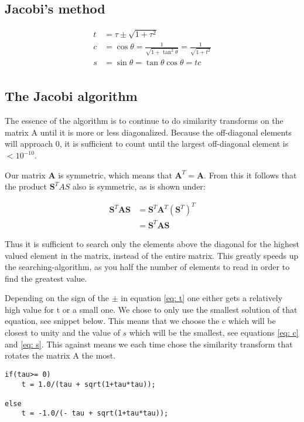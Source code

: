 \subsection{Jacobi's method}

\begin{align*}
t &= \tau \pm \sqrt{1+\tau^2}\\ 
c &= \cos \theta = \frac{1}{\sqrt{1+\tan^2\theta}} = \frac{1}{\sqrt{1+t^2}}\\
s &= \sin \theta = \tan \theta \cos \theta = t c\\
\end{align*}

\subsection{The Jacobi algorithm} \label{jacobi}

The essence of the algorithm is to continue to do similarity transforms on the matrix A until it is more or less diagonalized. Because the off-diagonal elements will approach $ 0 $, it is sufficient to count until the largest off-diagonal element is $ < 10^{-10} $. 

Our matrix \textbf{A} is symmetric, which means that $ \textbf{A}^T = \textbf{A} $. From this it follows that the product $ \textbf{S}^TAS $ also is symmetric, as is shown under:

\begin{align}
\textbf{S}^T\textbf{AS} &= \textbf{S}^T\textbf{A}^T(\textbf{S}^T)^T\\
&= \textbf{S}^T\textbf{AS} 
\end{align}

Thus  it is sufficient to search only the elements above the diagonal for the highest valued element in the matrix, instead of the entire matrix. This greatly speeds up the searching-algorithm, as you half the number of elements to read in order to find the greatest value. 

Depending on the sign of the $ \pm $ in equation \ref{eq: t} one either gets a relatively high value for t or a small one. We chose to only use the smallest solution of that equation, see snippet below.  This means that we choose the c  which will be closest to unity  and the value of $s$ which will be the smallest, see equations \ref{eq: c} and \ref{eq: s}. This against means we each time chose the similarity transform that rotates the matrix A the most. 


\begin{lstlisting}[caption={Determining $t$ in the program},label=kode]
if(tau>= 0)
	t = 1.0/(tau + sqrt(1+tau*tau));

else
	t = -1.0/(- tau + sqrt(1+tau*tau));
\end{lstlisting}

